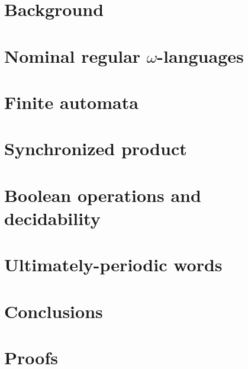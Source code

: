 \documentclass[orivec]{llncs}
\begin{document}
\section{Background}\label{sec:background}

\section{Nominal regular \texorpdfstring{$\omega$}{omega}-languages}\label{sec:languages}


\section{Finite automata}\label{sec:hd-automata}



\section{Synchronized product}\label{sec:sync-product}


\section{Boolean operations and decidability}\label{sec:boolean-operations-decidability}

\section{Ultimately-periodic words}\label{sec:up-words}

\section{Conclusions}\label{sec:conclusions}






\appendix
\section{Proofs}

\end{document}
